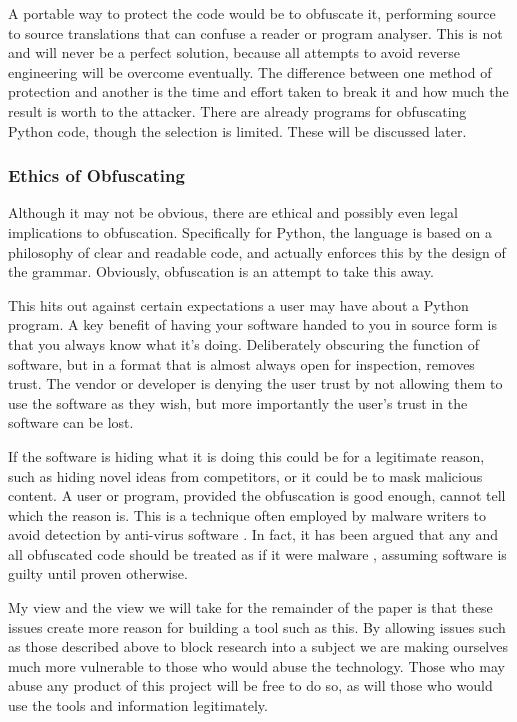 \documentclass{report}
\begin{document}
A portable way to protect the code would be to obfuscate it, performing source to source translations that can
confuse a reader or program analyser. This is not and will never be a perfect solution, because all attempts
to avoid reverse engineering will be overcome eventually. The difference between one method of protection and
another is the time and effort taken to break it and how much the result is worth to the attacker. There are already
programs for obfuscating Python code, though the selection is limited. These will be discussed later.

\subsubsection{Ethics of Obfuscating}

Although it may not be obvious, there are ethical and possibly even legal implications to obfuscation.
Specifically for Python, the language is based on a philosophy of clear and readable code, and actually
enforces this by the design of the grammar. Obviously, obfuscation is an attempt to take this away.

This hits out against certain expectations a user may have about a Python program. A key benefit of having your
software handed to you in source form is that you always know what it's doing. Deliberately obscuring the
function of software, but in a format that is almost always open for inspection, removes trust. The vendor or developer is
denying the user trust by not allowing them to use the software as they wish, but more importantly the user's
trust in the software can be lost.

If the software is hiding what it is doing this could be for a legitimate reason, such as hiding novel ideas
from competitors, or it could be to mask malicious content. A user or program, provided the obfuscation is
good enough, cannot tell which the reason is. This is a technique often employed by malware
writers to avoid detection by anti-virus software \cite{dycodeobf}. In fact, it has been argued that any and
all obfuscated code should be treated as if it were malware \cite{noobf}, assuming software is guilty until
proven otherwise.

My view and the view we will take for the remainder of the paper is that these issues create more reason for
building a tool such as this. By allowing issues such as those described above to block research into a subject
we are making ourselves much more vulnerable to those who would abuse the technology. Those who may abuse any
product of this project will be free to do so, as will those who would use the tools and information legitimately.
\end{document}
